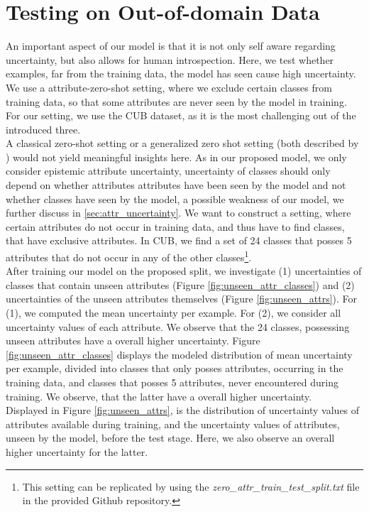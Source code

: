 \documentclass[a4paper,cleardoubleempty,BCOR1cm, 11pt]{report}
\begin{document}
\section{Testing on Out-of-domain Data}\label{sec:zero_shot}
An important aspect of our model is that it is not only self aware regarding uncertainty, but also allows for human introspection. Here, we test whether examples, far from the training data, the model has seen cause high uncertainty. We use a attribute-zero-shot setting, where we exclude certain classes from training data, so that some attributes are never seen by the model in training. For our setting, we use the CUB dataset, as it is the most challenging out of the introduced three.\\
A classical zero-shot setting or a generalized zero shot setting (both described by \cite{8413121}) would not yield meaningful insights here. As in our proposed model, we only consider epistemic attribute uncertainty, uncertainty of classes should only depend on whether attributes attributes have been seen by the model and not whether classes have seen by the model, a possible weakness of our model, we further discuss in \ref{sec:attr_uncertainty}. We want to construct a setting, where certain attributes do not occur in training data, and thus have to find classes, that have exclusive attributes. In CUB, we find a set of 24 classes that posses 5 attributes that do not occur in any of the other classes\footnote{This setting can be replicated by using the \textit{zero\_attr\_train\_test\_split.txt} file in the provided Github repository.}.\\
After training our model on the proposed split, we investigate (1) uncertainties of classes that contain unseen attributes (Figure \ref{fig:unseen_attr_classes}) and (2) uncertainties of the unseen attributes themselves (Figure \ref{fig:unseen_attrs}). For (1), we computed the mean uncertainty per example. For (2), we consider all uncertainty values of each attribute.
We observe that the 24 classes, possessing unseen attributes have a overall higher uncertainty. Figure \ref{fig:unseen_attr_classes} displays the modeled distribution of mean uncertainty per example, divided into classes that only posses attributes, occurring in the training data, and classes that posses 5 attributes, never encountered during training. We observe, that the latter have a overall higher uncertainty.\\
Displayed in Figure \ref{fig:unseen_attrs}, is the distribution of uncertainty values of attributes available during training, and the uncertainty values of attributes, unseen by the model, before the test stage. Here, we also observe an overall higher uncertainty for the latter.
\end{document}
